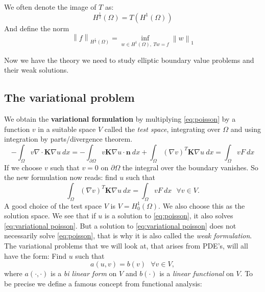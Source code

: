 \documentclass[../Main/main.tex]{subfiles}
\begin{document}
	\begin{remark}
		We often denote the image of $T$ as:
		\begin{equation*}
			 H^{\frac{1}{2}}(\Omega) = T(H^1(\Omega))
		\end{equation*}
		And define the norm
		\begin{equation*}
			\left \|f\right \|_{H^{\frac{1}{2}}(\Omega)} = \inf_{w\in H^1(\Omega), \ Tw=f} \left \| w \right \|_1
		\end{equation*}
	\end{remark}
	Now we have the theory we need to study elliptic boundary value problems and their weak solutions.
	\subsection*{The variational problem}
	We obtain the \textbf{variational formulation} by multiplying \eqref{eq:poisson} by a function $v$ in a suitable space $V$ called the \emph{test space}, integrating over $\Omega$ and using integration by parts/divergence theorem.
	\begin{equation*}
		-\int_{\Omega}v\nabla \cdot\bm{K}\nabla u \ dx = -\int_{\partial \Omega}v \bm{K}\nabla u \cdot \bm{n} \ dx + \int_{\Omega}(\nabla v)^{T}\bm{K} \nabla u \ dx = \int_{\Omega}v F \ dx
	\end{equation*}
	If we choose $v$ such that $v=0$ on $\partial \Omega$ the integral over the boundary vanishes. So the new formulation now reads: find $u$ such that 
	\begin{equation}\label{eq:variational poisson}
			 \int_{\Omega}(\nabla v)^T \bm{K} \nabla u \ dx = \int_{\Omega}v F \ dx \ \ \  \forall v \in V.
	\end{equation}
	A good choice of the test space $V$ is $V=H_0^1(\Omega)$. We also choose this as the solution space.
	We see that if $u$ is a solution to \eqref{eq:poisson}, it also solves \eqref{eq:variational poisson}. But a solution to \eqref{eq:variational poisson} does not necessarily solve \eqref{eq:poisson}, that is why it is also called the \emph{weak formulation}.\\
	The variational problems that we will look at, that arises from PDE's, will all have the form: Find $u$ such that
	\begin{equation}\label{eq:variational problem}
			a(u,v) = b(v) \ \ \ \forall v \in V,
	\end{equation}
	where $a(\cdot,\cdot)$ is a \emph{bi linear form} on $V$ and $b(\cdot)$ is a \emph{linear functional} on $V$. To be precise we define a famous concept from functional analysis:
\end{document}
